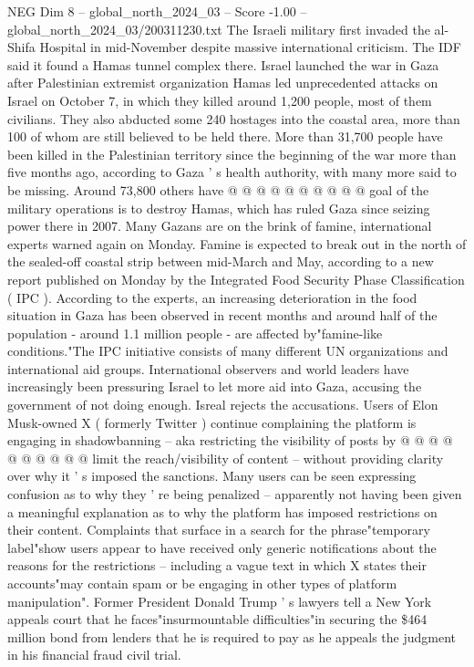 \begin{textsample}{NEG Dim 8 – global\_north\_2024\_03 – Score -1.00 – global\_north\_2024\_03/200311230.txt}
The Israeli military first invaded the al-Shifa Hospital in mid-November despite massive international criticism.
The IDF said it found a Hamas tunnel complex there.
Israel launched the war in Gaza after Palestinian extremist organization Hamas led unprecedented attacks on Israel on October 7, in which they killed around 1,200 people, most of them civilians.
They also abducted some 240 hostages into the coastal area, more than 100 of whom are still believed to be held there.
More than 31,700 people have been killed in the Palestinian territory since the beginning of the war more than five months ago, according to Gaza ' s health authority, with many more said to be missing.
Around 73,800 others have @ @ @ @ @ @ @ @ @ @ goal of the military operations is to destroy Hamas, which has ruled Gaza since seizing power there in 2007.
Many Gazans are on the brink of famine, international experts warned again on Monday.
Famine is expected to break out in the north of the sealed-off coastal strip between mid-March and May, according to a new report published on Monday by the Integrated Food Security Phase Classification ( IPC ).
According to the experts, an increasing deterioration in the food situation in Gaza has been observed in recent months and around half of the population - around 1.1 million people - are affected by"famine-like conditions."The IPC initiative consists of many different UN organizations and international aid groups.
International observers and world leaders have increasingly been pressuring Israel to let more aid into Gaza, accusing the government of not doing enough.
Isreal rejects the accusations.
Users of Elon Musk-owned X ( formerly Twitter ) continue complaining the platform is engaging in shadowbanning -- aka restricting the visibility of posts by @ @ @ @ @ @ @ @ @ @ limit the reach/visibility of content -- without providing clarity over why it ' s imposed the sanctions.
Many users can be seen expressing confusion as to why they ' re being penalized -- apparently not having been given a meaningful explanation as to why the platform has imposed restrictions on their content.
Complaints that surface in a search for the phrase"temporary label"show users appear to have received only generic notifications about the reasons for the restrictions -- including a vague text in which X states their accounts"may contain spam or be engaging in other types of platform manipulation".
Former President Donald Trump ' s lawyers tell a New York appeals court that he faces"insurmountable difficulties"in securing the \$464 million bond from lenders that he is required to pay as he appeals the judgment in his financial fraud civil trial.

\end{textsample}
